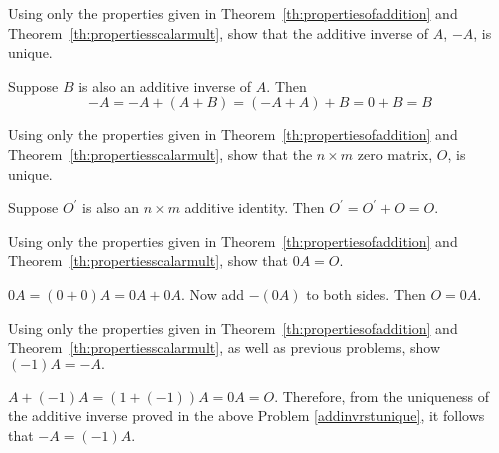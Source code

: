\documentclass{ximera}
\begin{document}
\begin{problem}\label{prb:4.5} Using only the properties given in Theorem~\ref{th:propertiesofaddition}
 and Theorem~\ref{th:propertiesscalarmult},
show that the additive inverse of $A$, $-A$, is unique.

\begin{hint}
 Suppose $B$ is also an additive inverse of $A$. Then
\[
-A=-A+\left( A+B\right) =\left( -A+A\right) +B=0+B=B
\]
\end{hint}
\end{problem}

\begin{problem}\label{prb:4.6} Using only the properties given in Theorem~\ref{th:propertiesofaddition}
 and Theorem~\ref{th:propertiesscalarmult},
show that the $n\times m$ zero matrix, $O$, is unique.

\begin{hint}
Suppose $O^{\prime }$ is also an $n\times m$ additive identity. Then $O^{\prime }=O^{\prime }+O=O.$
\end{hint}
\end{problem}

\begin{problem}\label{prb:4.7} Using only the properties given in Theorem~\ref{th:propertiesofaddition}
 and Theorem~\ref{th:propertiesscalarmult}, show that $0A=O.$ 

\begin{hint}
$0A=\left( 0+0\right) A=0A+0A.$ Now add $-\left(
0A\right) $ to both sides. Then $O=0A$.
\end{hint}
\end{problem}

\begin{problem}\label{prb:4.8} Using only the properties given in Theorem~\ref{th:propertiesofaddition}
 and Theorem~\ref{th:propertiesscalarmult}, as well as previous
problems, show $\left( -1\right) A=-A.$

\begin{hint}
$A+\left( -1\right) A=\left( 1+\left(
-1\right) \right) A=0A=O.$ Therefore, from the uniqueness of the additive
inverse proved in the above Problem \ref{addinvrstunique}, it follows that $
-A=\left( -1\right) A$.
\end{hint}
\end{problem}
\end{document}
